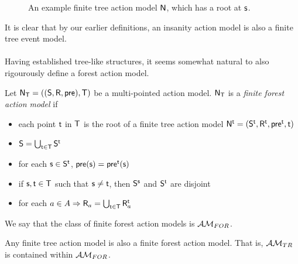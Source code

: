 \begin{figure}
\centering
{}
\caption[Example tree]{An example finite tree action model $\evM$, which has a root at $\evs$.}
\label{figure:exampleTree}
\end{figure}

It is clear that by our earlier definitions, an insanity action model is also a finite tree event
model.\\
\\
Having established tree-like structures, it seems somewhat natural to also rigourously define a
forest action model.

\begin{defn} \label{forest}
Let $\evM_\evT = ((\evS, \evR, \evpr), \evT)$ be a multi-pointed action model.
$\evM_\evT$ is a {\em finite forest action model} if
\begin{itemize}
	\item each point $\evt$ in $\evT$ is the root of a finite tree action model $\evM^\evt =
	(\evS^\evt, \evR^\evt,
	\evpr^\evt, \evt)$
  \item $\evS = \bigcup_{\evt \in \evT} \evS^\evt$
	\item for each $\evs \in \evS^\evt$, $\evpr(\evs) = \evpr^\evt(\evs)$
	\item if $\evs, \evt \in \evT$ such that $\evs \neq \evt$, then $\evS^\evs$ and $\evS^\evt$ are disjoint
  \item for each $a \in A \Rightarrow \evR_a = \bigcup_{\evt \in \evT} \evR_a^\evt$
\end{itemize}
\end{defn}

We say that the class of finite forest action models is $\forestClass$.

\begin{lemma} \label{treeIsForest}
	Any finite tree action model is also a finite forest action model.
	That is, $\treeClass$ is contained within $\forestClass$.
\end{lemma}

